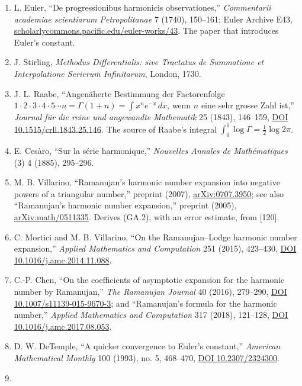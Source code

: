 \documentclass[
  11pt,
]{book}
\begin{document}
\begin{enumerate}
\item
  L. Euler, ``De progressionibus harmonicis observationes,''
  \emph{Commentarii academiae scientiarum Petropolitanae} 7 (1740),
  150--161; Euler Archive E43,
  \href{https://scholarlycommons.pacific.edu/euler-works/43/}{scholarlycommons.pacific.edu/euler-works/43}.
  The paper that introduces Euler's constant.
\item
  J. Stirling, \emph{Methodus Differentialis: sive Tractatus de
  Summatione et Interpolatione Serierum Infinitarum}, London, 1730.
\item
  J. L. Raabe, ``Angenäherte Bestimmung der Factorenfolge
  \(1\cdot2\cdot3\cdot4\cdot5\cdots n=\Gamma(1+n)=\int x^ne^{-x}\,dx\),
  wenn \(n\) eine sehr grosse Zahl ist,'' \emph{Journal für die reine
  und angewandte Mathematik} 25 (1843), 146--159,
  \href{https://doi.org/10.1515/crll.1843.25.146}{DOI
  10.1515/crll.1843.25.146}. The source of Raabe's integral
  \(\int_0^1\log\Gamma=\tfrac12\log2\pi\).
\item
  E. Cesàro, ``Sur la série harmonique,'' \emph{Nouvelles Annales de
  Mathématiques} (3) 4 (1885), 295--296.
\item
  M. B. Villarino, ``Ramanujan's harmonic number expansion into negative
  powers of a triangular number,'' preprint (2007),
  \href{https://arxiv.org/abs/0707.3950}{arXiv:0707.3950}; see also
  ``Ramanujan's harmonic number expansion,'' preprint (2005),
  \href{https://arxiv.org/abs/math/0511335}{arXiv:math/0511335}. Derives
  (GA.2), with an error estimate, from {[}120{]}.
\item
  C. Mortici and M. B. Villarino, ``On the Ramanujan--Lodge harmonic
  number expansion,'' \emph{Applied Mathematics and Computation} 251
  (2015), 423--430, \href{https://doi.org/10.1016/j.amc.2014.11.088}{DOI
  10.1016/j.amc.2014.11.088}.
\item
  C.-P. Chen, ``On the coefficients of asymptotic expansion for the
  harmonic number by Ramanujan,'' \emph{The Ramanujan Journal} 40
  (2016), 279--290, \href{https://doi.org/10.1007/s11139-015-9670-3}{DOI
  10.1007/s11139-015-9670-3}; and ``Ramanujan's formula for the harmonic
  number,'' \emph{Applied Mathematics and Computation} 317 (2018),
  121--128, \href{https://doi.org/10.1016/j.amc.2017.08.053}{DOI
  10.1016/j.amc.2017.08.053}.
\item
  D. W. DeTemple, ``A quicker convergence to Euler's constant,''
  \emph{American Mathematical Monthly} 100 (1993), no. 5, 468--470,
  \href{https://doi.org/10.2307/2324300}{DOI 10.2307/2324300}.
\item

\end{enumerate}
\end{document}
